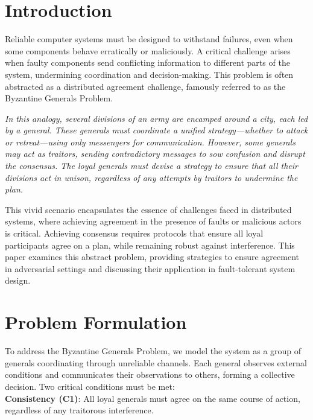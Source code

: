 \documentclass[12pt]{article}
\theoremstyle{remark}
\begin{document}
\section*{\centering Introduction}

Reliable computer systems must be designed to withstand failures, even when some components behave erratically or maliciously. A critical challenge arises when faulty components send conflicting information to different parts of the system, undermining coordination and decision-making. This problem is often abstracted as a distributed agreement challenge, famously referred to as the Byzantine Generals Problem.

\textit{In this analogy, several divisions of an army are encamped around a city, each led by a general. These generals must coordinate a unified strategy—whether to attack or retreat—using only messengers for communication. However, some generals may act as traitors, sending contradictory messages to sow confusion and disrupt the consensus. The loyal generals must devise a strategy to ensure that all their divisions act in unison, regardless of any attempts by traitors to undermine the plan.}

This vivid scenario encapsulates the essence of challenges faced in distributed systems, where achieving agreement in the presence of faults or malicious actors is critical. Achieving consensus requires protocols that ensure all loyal participants agree on a plan, while remaining robust against interference. This paper examines this abstract problem, providing strategies to ensure agreement in adversarial settings and discussing their application in fault-tolerant system design.

\section*{\centering Problem Formulation}
To address the Byzantine Generals Problem, we model the system as a group of generals coordinating through unreliable channels. Each general observes external conditions and communicates their observations to others, forming a collective decision. Two critical conditions must be met:\\

\textbf{Consistency (C1)}: All loyal generals must agree on the same course of action, regardless of any traitorous interference.
\end{document}
